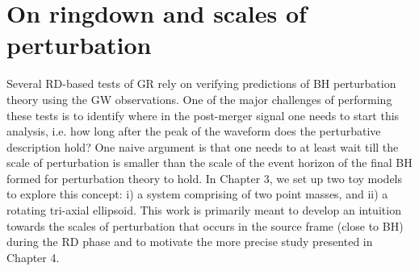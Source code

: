 \section{On ringdown and scales of perturbation}
Several RD-based tests of GR rely on verifying predictions of BH perturbation theory using the GW observations. One of the major challenges of performing these tests is to identify where in the post-merger signal one needs to start this analysis, i.e. how long after the peak of the waveform does the perturbative description hold? One naive argument is that one needs to at least wait till the scale of perturbation is smaller than the scale of the event horizon of the final BH formed for perturbation theory to hold. In Chapter 3, we set up two toy models to explore this concept: i) a system comprising of two point masses, and ii) a rotating tri-axial ellipsoid.  This work is primarily meant to develop an intuition towards the scales of perturbation that occurs in the source frame (close to BH) during the RD phase and to motivate the more precise study presented in Chapter 4. 





